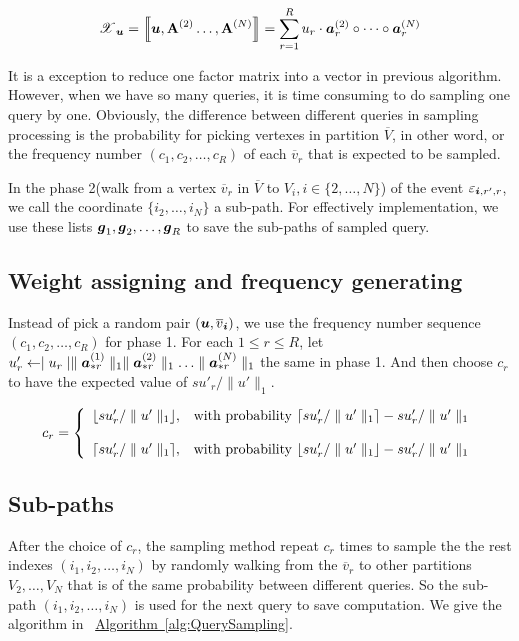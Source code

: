 \documentclass{article}
\newcommand{\T}[1]{\boldsymbol{\mathscr{\MakeUppercase{#1}}}}
\newcommand{\KT}[1]{\left\llbracket #1 \right\rrbracket}
\newcommand{\V}[1]{{\bm{{\MakeLowercase{#1}}}}}
\newcommand{\VnC}[3]{\V{#1}^{(#2)}_{#3}}
\newcommand{\Vacol}[1]{\V{a}^{(#1)}_{*r}}
\newcommand{\M}[1]{{\bm{\mathbf{\MakeUppercase{#1}}}}}
\newcommand{\Mn}[2]{\M{#1}^{(#2)}}
\newcommand{\norm}[2]{\parallel#1\parallel_{#2}}
\newcommand{\Alg}[1] {\hyperref[alg:#1] {Algorithm~\ref*{alg:#1}}}
\begin{document}
\begin{equation}\label{eq:RankTensorCP}
\T{X}_{\V{u}}= \KT{ \V{u},\Mn{A}{2}\dots,\Mn{A}{N}} =
\sum_{r=1}^{R} u_r \cdot \VnC{A}{2}{r}\circ \cdots \circ \VnC{A}{N}{r}
\end{equation}

It is a exception to reduce one factor matrix into a vector in previous algorithm. However, when we have so many queries, it is time consuming to do sampling one query by one. Obviously, the difference between different queries in sampling processing is the probability for picking vertexes in partition $\overline{V}$, in other word, or the frequency number $(c_1,c_2,\ldots,c_R)$ of each $\overline{v}_r$ that is expected to be sampled.

In the phase 2(walk from a vertex $\overline{v}_r$ in $\overline{V}$ to $V_i,i\in\{2,\ldots,N\}$) of the event $\varepsilon_{\V{i},r',r}$, we call the coordinate $\{i_2,\ldots,i_N\}$ a sub-path. For effectively implementation, we use these lists $\V{g}_1,\V{g}_2,\ldots,\V{g}_R$ to save the sub-paths of sampled query.


\subsection{Weight assigning and frequency generating}
Instead of pick a random pair $(\V{u},\overline{v}_{\V{i}})$, we use the frequency number sequence $(c_1,c_2,\ldots,c_R)$ for phase 1. For each $1 \leq r \leq R$, let $u'_r \leftarrow \mid u_r\mid \norm{\Vacol{1}}{1} \norm{\Vacol{2}}{1} \ldots \norm{\Vacol{N}}{1}$ the same in phase 1.
And then choose $c_r$ to have the expected value of $su'_r/\norm{u'}{1}$.

 \begin{equation*}c_r=
    \left\{
      \begin{array}{ll}
        \lfloor su'_r/\norm{u'}{1} \rfloor,
        & \hbox{with probability $\lceil su'_r/\norm{u'}{1} \rceil - su'_r/\norm{u'}{1}$} \\\\
        \lceil su'_r/\norm{u'}{1} \rceil,
        & \hbox{with probability $\lfloor su'_r/\norm{u'}{1} \rfloor - su'_r/\norm{u'}{1}$}
      \end{array}
    \right.
    \end{equation*}

\subsection{Sub-paths}
After the choice of $c_r$, the sampling method repeat $c_r$ times to sample the the rest indexes $(i_1,i_2,\ldots,i_N)$ by randomly walking from the $\overline{v}_r$ to other partitions $V_2,\ldots,V_N$ that is of the same probability between different queries. So the sub-path $(i_1,i_2,\ldots,i_N)$ is used for the next query to save computation. We give the algorithm in ~\Alg{QuerySampling}.
\end{document}
